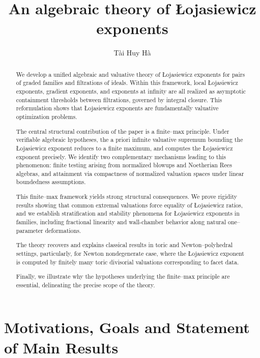 \documentclass[12pt]{amsart}
\title[Algebraic \L ojasiewicz exponents]{An algebraic theory of \L ojasiewicz exponents}
\author{T\`ai Huy H\`a}
\theoremstyle{plain}
\theoremstyle{definition}
\numberwithin{equation}{section}
\begin{document}
	\maketitle
	
\begin{abstract}
	We develop a unified algebraic and valuative theory of \L{}ojasiewicz
	exponents for pairs of graded families and filtrations of ideals.
	Within this framework, local \L{}ojasiewicz exponents, gradient
	exponents, and exponents at infinity are all realized as asymptotic
	containment thresholds between filtrations, governed by integral
	closure.
	This reformulation shows that \L{}ojasiewicz exponents are fundamentally
	valuative optimization problems.
	
	The central structural contribution of the paper is a finite--max
	principle.
	Under verifiable algebraic hypotheses, the a priori infinite
	valuative supremum bounding the \L{}ojasiewicz exponent reduces to a
	finite maximum, and computes the \L{}ojasiewicz exponent precisely.
	We identify two complementary mechanisms leading to this phenomenon:
	finite testing arising from normalized blowups and Noetherian Rees algebras, and attainment via compactness of normalized valuation spaces under linear boundedness assumptions.
	
	This finite--max framework yields strong structural consequences.
	We prove rigidity results showing that common extremal valuations force
	equality of \L{}ojasiewicz ratios, and we establish stratification and
	stability phenomena for \L{}ojasiewicz exponents in families, including
	fractional linearity and wall-chamber behavior along natural one--parameter deformations.
	
	The theory recovers and explains classical results in toric
	and Newton--polyhedral settings, particularly, for Newton nondegenerate case, where the \L{}ojasiewicz exponent is computed by
	finitely many toric divisorial valuations corresponding to facet data.
	
	Finally, we illustrate why the hypotheses underlying the finite--max
	principle are essential, delineating the precise scope of the theory.
\end{abstract}


	\tableofcontents



\part{Motivations, Goals and Statement of Main Results} \label{part:Intro}
\end{document}
